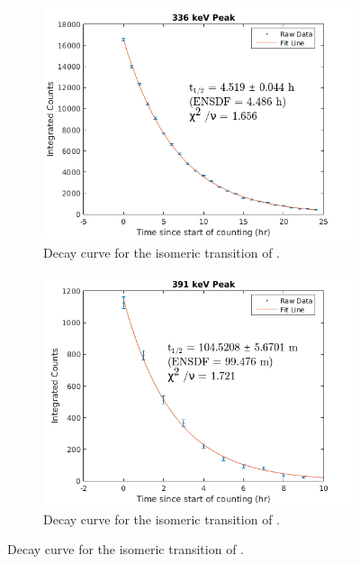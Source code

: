 \documentclass[5p]{elsarticle}
\begin{document}
\begin{figure}
    \centering
    \begin{subfigure}[t]{0.49\textwidth}
        \centering
        \includegraphics[scale=0.6]{./figures/336keV_curve2.png}
        \caption{ Decay curve for the isomeric transition of .}
        \label{fig:decay_curve_336}
    \end{subfigure}%
     \begin{subfigure}[t]{0.49\textwidth}
        \centering
        \includegraphics[scale=0.6]{./figures/391keV_curve2.png}
        \caption{ Decay curve for the isomeric transition of .}

\end{subfigure}
\end{figure}
\end{document}
